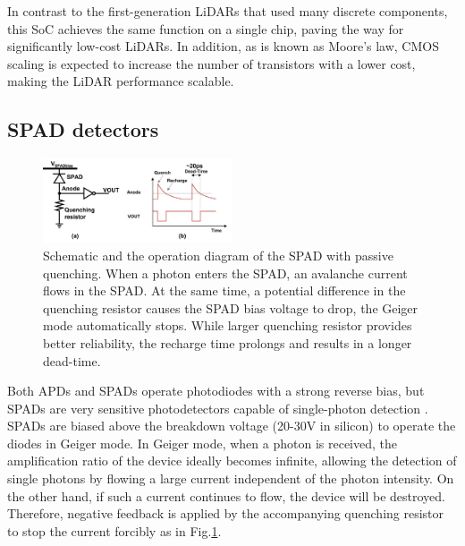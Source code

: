 \documentclass[paper]{ieice}
\begin{document}
In contrast to the first-generation LiDARs that used many discrete components, this SoC achieves the same function on a single chip, paving the way for significantly low-cost LiDARs. In addition, as is known as Moore's law, CMOS scaling is expected to increase the number of transistors with a lower cost, making the LiDAR performance scalable.

\subsection{SPAD detectors}
\begin{figure}[!t]
\centering
 \includegraphics[width=0.5\textwidth]{figs/spad.png}
  \caption{Schematic and the operation diagram of the SPAD with passive quenching. When a photon enters the SPAD, an avalanche current flows in the SPAD. At the same time, a potential difference in the quenching resistor causes the SPAD bias voltage to drop, the Geiger mode automatically stops. While larger quenching resistor provides better reliability, the recharge time prolongs and results in a longer dead-time.}
\label{spad}
\end{figure}

\qquad Both APDs and SPADs operate photodiodes with a strong reverse bias, but SPADs are very sensitive photodetectors capable of single-photon detection \cite{niclass2005design, zappa2007spad, stoppa2009spad, niclass2007spad, gariepy2015single}. SPADs are biased above the breakdown voltage (20-30V in silicon) to operate the diodes in Geiger mode. In Geiger mode, when a photon is received, the amplification ratio of the device ideally becomes infinite, allowing the detection of single photons by flowing a large current independent of the photon intensity. On the other hand, if such a current continues to flow, the device will be destroyed. Therefore, negative feedback is applied by the accompanying quenching resistor to stop the current forcibly as in Fig.\ref{spad}.
\end{document}
